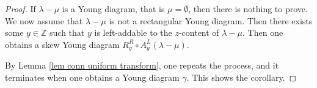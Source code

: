 \documentclass[11pt]{amsart}
\numberwithin{equation}{section}
\theoremstyle{definition}
\newtheorem{lemma}[thm]{Lemma}
\newtheorem{corollary}[thm]{Corollary}
\begin{document}
\begin{proof}
If $\lambda-\mu$ is a Young diagram, that is $\mu=\emptyset$, then there is nothing to prove. We now assume that $\lambda-\mu$ is not a rectangular Young diagram. Then there exists some $y \in \mathbb Z$ such that $y$ is left-addable to the $z$-content of $\lambda-\mu$. Then one obtains a skew Young diagram $R^R_y\circ A_y^L(\lambda-\mu)$.

By Lemma \ref{lem conn uniform transform}, one repeats the process, and it terminates when one obtains a Young diagram $\gamma$. This shows the corollary.
\end{proof}











 
\end{document}
